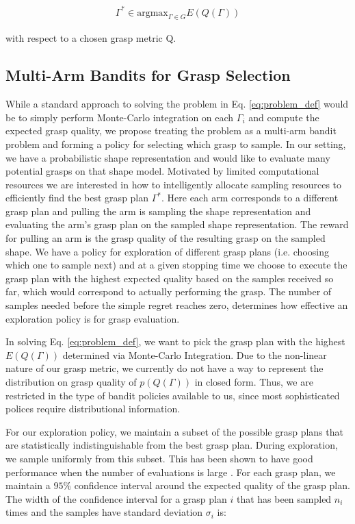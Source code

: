 \documentclass[letterpaper, 10 pt, conference]{ieeeconf}  %
\begin{document}
\begin{align}\label{eq:problem_def}
\Gamma^* \in \mbox{argmax}_{\Gamma \in G} E(Q(\Gamma))
\end{align}

with respect to a chosen grasp metric Q. 


\subsection{Multi-Arm Bandits for Grasp Selection}
While a standard approach to solving the problem in Eq. \ref{eq:problem_def} would be to simply perform Monte-Carlo integration on each $\Gamma_i$ and compute the expected grasp quality, we propose treating the problem as a multi-arm bandit problem and forming a policy for selecting which grasp to sample. 
In our setting, we have a probabilistic shape representation and would like to evaluate many potential grasps on that shape model.
Motivated by limited computational resources we are interested in how to intelligently allocate sampling resources to efficiently find the best grasp plan $\Gamma^*$.
Here each arm corresponds to a different grasp plan and pulling the arm is sampling the shape representation and evaluating the arm's grasp plan on the sampled shape representation.
The reward for pulling an arm is the grasp quality of the resulting grasp on the sampled shape.
We have a policy for exploration of different grasp plans (i.e. choosing which one to sample next) and at a given stopping time we choose to execute the grasp plan with the highest expected quality based on the samples received so far, which would correspond to actually performing the grasp.  
The number of samples needed before the simple regret reaches zero, determines how effective an exploration policy is for grasp evaluation.

In solving Eq. \ref{eq:problem_def}, we want to pick the grasp plan with the highest $E(Q(\Gamma))$ determined via Monte-Carlo Integration.
Due to the non-linear nature of our grasp metric, we currently do not have a way to represent the distribution on grasp quality of $p(Q(\Gamma))$ in closed form.
Thus, we are restricted in the type of bandit policies available to us, since most sophisticated polices require distributional information. 

For our exploration policy, we maintain a subset of the possible grasp plans that are statistically indistinguishable from the best grasp plan.
During exploration, we sample uniformly from this subset.
This has been shown to have good performance when the number of evaluations is large \cite{bubeck2009pure}.
For each grasp plan, we maintain a $95\%$ confidence interval around the expected quality of the grasp plan.
The width of the confidence interval for a grasp plan $i$ that has been sampled $n_i$ times and the samples have standard deviation $\sigma_i$ is:
\end{document}
